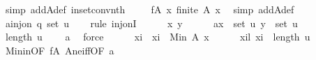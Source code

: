 \begin{isabellebody}
\ {\isacharparenleft}{\kern0pt}simp\ add{\isacharcolon}{\kern0pt}A{\isacharunderscore}{\kern0pt}def\ in{\isacharunderscore}{\kern0pt}set{\isacharunderscore}{\kern0pt}conv{\isacharunderscore}{\kern0pt}nth{\isacharparenright}{\kern0pt}\ \isanewline
\ \ \isamarkupfalse%
\ f{\isacharunderscore}{\kern0pt}A{\isacharcolon}{\kern0pt}\ {\isachardoublequoteopen}{\isasymAnd}x{\isachardot}{\kern0pt}\ finite\ {\isacharparenleft}{\kern0pt}A\ x{\isacharparenright}{\kern0pt}{\isachardoublequoteclose}\ \isamarkupfalse%
\ {\isacharparenleft}{\kern0pt}simp\ add{\isacharcolon}{\kern0pt}A{\isacharunderscore}{\kern0pt}def{\isacharparenright}{\kern0pt}\isanewline
\isanewline
\ \ \isamarkupfalse%
\ a{\isacharcolon}{\kern0pt}{\isachardoublequoteopen}inj{\isacharunderscore}{\kern0pt}on\ q\ {\isacharparenleft}{\kern0pt}set\ u{\isacharparenright}{\kern0pt}{\isachardoublequoteclose}\isanewline
\ \ \isamarkupfalse%
\ {\isacharparenleft}{\kern0pt}rule\ inj{\isacharunderscore}{\kern0pt}onI{\isacharparenright}{\kern0pt}\isanewline
\ \ \ \ \isamarkupfalse%
\ x\ y\isanewline
\ \ \ \ \isamarkupfalse%
\ a{\isacharunderscore}{\kern0pt}{}{\isacharcolon}{\kern0pt}{\isachardoublequoteopen}x\ {\isasymin}\ set\ u{\isachardoublequoteclose}\ {\isachardoublequoteopen}y\ {\isasymin}\ set\ u{\isachardoublequoteclose}\isanewline
\ \ \ \ \isamarkupfalse%
\ {\isachardoublequoteopen}length\ u\ {\isachargreater}{\kern0pt}\ {}{\isachardoublequoteclose}\ \isamarkupfalse%
\ a{\isacharunderscore}{\kern0pt}{}\ \isamarkupfalse%
\ force\isanewline
\ \ \ \ \isamarkupfalse%
\ xi\ \ {\isachardoublequoteopen}xi\ {\isacharequal}{\kern0pt}\ Min\ {\isacharparenleft}{\kern0pt}A\ x{\isacharparenright}{\kern0pt}{\isachardoublequoteclose}\isanewline
\ \ \ \ \isamarkupfalse%
\ xi{\isacharunderscore}{\kern0pt}l{\isacharcolon}{\kern0pt}\ {\isachardoublequoteopen}xi\ {\isacharless}{\kern0pt}\ length\ u{\isachardoublequoteclose}\isanewline
\ \ \ \ \ \ \isamarkupfalse%
\ Min{\isacharunderscore}{\kern0pt}in{\isacharbrackleft}{\kern0pt}OF\ f{\isacharunderscore}{\kern0pt}A\ A{\isacharunderscore}{\kern0pt}ne{\isacharunderscore}{\kern0pt}iff{\isacharbrackleft}{\kern0pt}OF\ a{\isacharunderscore}{\kern0pt}{}{\isacharparenleft}{\kern0pt}{}{\isacharparenright}{\kern0pt}{\isacharbrackright}{\kern0pt}{\isacharbrackright}{\kern0pt}\isanewline
\ \ \ \ \ \ \isamarkupfalse%

\end{isabellebody}
